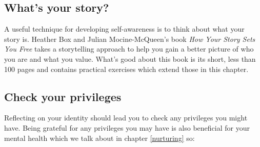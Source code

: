 \documentclass[
]{book}
\begin{document}
\hypertarget{freeyourstory}{%
\subsection{What's your story?}\label{freeyourstory}}

A useful technique for developing self-awareness is to think about what your story is. Heather Box and Julian Mocine-McQueen's book \emph{How Your Story Sets You Free} \citep{freeyourstory} takes a storytelling approach to help you gain a better picture of who you are and what you value. What's good about this book is its short, less than 100 pages and contains practical exercises which extend those in this chapter.

\hypertarget{privileged}{%
\subsection{Check your privileges}\label{privileged}}

Reflecting on your identity should lead you to check any privileges you might have. Being grateful for any privileges you may have is also beneficial for your mental health which we talk about in chapter \ref{nurturing} so:
\end{document}
